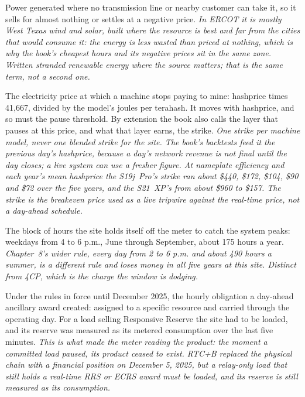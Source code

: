 \begin{description}[leftmargin=0pt,style=unboxed,itemsep=0.35em,parsep=0.15em]
\item[stranded energy] \hypertarget{glossary:stranded-energy}{}Power generated where no transmission line or nearby customer can take it, so it sells for almost nothing or settles at a negative price. \emph{In ERCOT it is mostly West Texas wind and solar, built where the resource is best and far from the cities that would consume it: the energy is less wasted than priced at nothing, which is why the book's cheapest hours and its negative prices sit in the same zone. Written stranded renewable energy where the source matters; that is the same term, not a second one.}
\item[strike price (the strike)] \hypertarget{glossary:strike-price}{}The electricity price at which a machine stops paying to mine: hashprice times 41,667, divided by the model's joules per terahash. It moves with hashprice, and so must the pause threshold. By extension the book also calls the layer that pauses at this price, and what that layer earns, the strike. \emph{One strike per machine model, never one blended strike for the site. The book's backtests feed it the previous day's hashprice, because a day's network revenue is not final until the day closes; a live system can use a fresher figure. At nameplate efficiency and each year's mean hashprice the S19j~Pro's strike ran about \$440, \$172, \$104, \$90 and \$72 over the five years, and the S21~XP's from about \$960 to \$157. The strike is the breakeven price used as a live tripwire against the real-time price, not a day-ahead schedule.}
\item[summer window] \hypertarget{glossary:summer-window}{}The block of hours the site holds itself off the meter to catch the system peaks: weekdays from 4 to 6 p.m., June through September, about 175 hours a year. \emph{Chapter~8's wider rule, every day from 2 to 6 p.m. and about 490 hours a summer, is a different rule and loses money in all five years at this site. Distinct from 4CP, which is the charge the window is dodging.}
\item[supply responsibility] \hypertarget{glossary:supply-responsibility}{}Under the rules in force until December 2025, the hourly obligation a day-ahead ancillary award created: assigned to a specific resource and carried through the operating day. For a load selling Responsive Reserve the site had to be loaded, and its reserve was measured as its metered consumption over the last five minutes. \emph{This is what made the meter reading the product: the moment a committed load paused, its product ceased to exist. RTC+B replaced the physical chain with a financial position on December 5, 2025, but a relay-only load that still holds a real-time RRS or ECRS award must be loaded, and its reserve is still measured as its consumption.}

\end{description}
